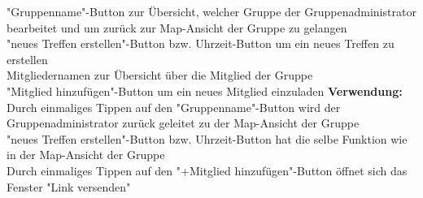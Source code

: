"Gruppenname"-Button zur Übersicht, welcher Gruppe der Gruppenadministrator bearbeitet und um zurück zur Map-Ansicht der Gruppe zu gelangen\\
"neues Treffen erstellen"-Button bzw. Uhrzeit-Button um ein neues Treffen zu erstellen\\
Mitgliedernamen zur Übersicht über die Mitglied der Gruppe\\
"Mitglied hinzufügen"-Button um ein neues Mitglied einzuladen
\textbf{Verwendung:}\\
Durch einmaliges Tippen auf den "Gruppenname"-Button wird der Gruppenadministrator zurück geleitet zu der Map-Ansicht der Gruppe\\
"neues Treffen erstellen"-Button bzw. Uhrzeit-Button hat die selbe Funktion wie in der Map-Ansicht der Gruppe\\
Durch einmaliges Tippen auf den "+Mitglied hinzufügen"-Button öffnet sich das Fenster "Link versenden"\\ \\

